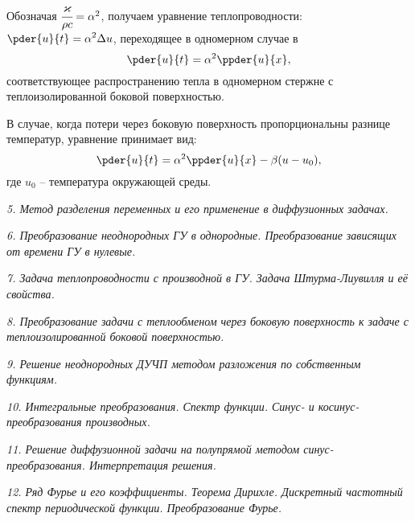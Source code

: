 Обозначая \( \cfrac{\kappa}{\rho c} = \alpha^2 \), получаем уравнение
теплопроводности: \( \ds \pder{u}{t} = \alpha^2\Delta u \), переходящее в
одномерном случае в
\[
    \pder{u}{t} = \alpha^2\ppder{u}{x},
\]
соответствующее распространению тепла в одномерном стержне с теплоизолированной
боковой поверхностью.

В случае, когда потери через боковую поверхность пропорциональны разнице
температур, уравнение принимает вид:
\[
    \pder{u}{t} = \alpha^2\ppder{u}{x} - \beta(u - u_0),
\]
где \( u_0 \) -- температура окружающей среды.

\newpage %

\emph{5. Метод разделения переменных и его применение в диффузионных задачах.}

\newpage %

\emph{6. Преобразование неоднородных ГУ в однородные. Преобразование зависящих
от времени ГУ в нулевые.}

\newpage %

\emph{7. Задача теплопроводности с производной в ГУ. Задача Штурма-Лиувилля и её
свойства.}

\newpage %

\emph{8. Преобразование задачи с теплообменом через боковую поверхность к задаче
с теплоизолированной боковой поверхностью.}

\newpage %

\emph{9. Решение неоднородных ДУЧП методом разложения по собственным функциям.}

\newpage %

\emph{10. Интегральные преобразования. Спектр функции. Синус- и
косинус-преобразования производных.}

\newpage %

\emph{11. Решение диффузионной задачи на полупрямой методом
синус-преобразования. Интерпретация решения.}

\newpage %

\emph{12. Ряд Фурье и его коэффициенты. Теорема Дирихле. Дискретный частотный
спектр периодической функции. Преобразование Фурье.}

